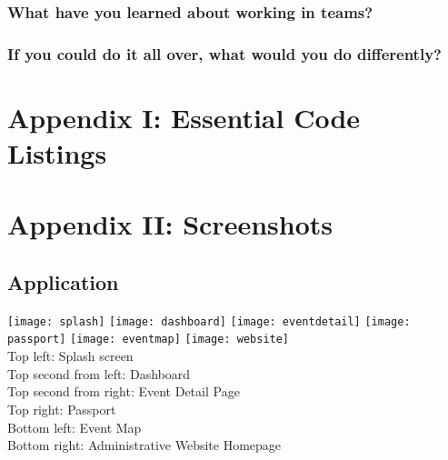 \documentclass[onecolumn, draftclsnofoot,10pt, compsoc]{IEEEtran}
\begin{document}
    \subsubsection{What have you learned about working in teams?}
    \subsubsection{\textbf{If you could do it all over, what would you do differently?}}
  \newpage

\section{Appendix I: Essential Code Listings}
  \newpage

\section{Appendix II: Screenshots}
  \subsection{Application}
    \texttt{[image: splash]}
    \texttt{[image: dashboard]}
    \texttt{[image: eventdetail]}
    \texttt{[image: passport]}
    \texttt{[image: eventmap]}
    \texttt{[image: website]} \\
    Top left: Splash screen \\
    Top second from left: Dashboard \\
    Top second from right: Event Detail Page \\
    Top right: Passport \\
    Bottom left: Event Map \\
    Bottom right: Administrative Website Homepage \\
\end{document}
